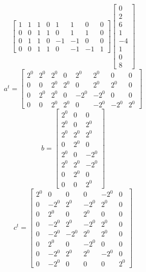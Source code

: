 \documentclass{article}%
\begin{document}
\[\left[\begin{matrix}1 & 1 & 1 & 0 & 1 & 1 & 0 & 0\\0 & 0 & 1 & 1 & 0 & 1 & 1 & 0\\0 & 1 & 1 & 0 & -1 & -1 & 0 & 0\\0 & 0 & 1 & 1 & 0 & -1 & -1 & 1\end{matrix}\right] \left[\begin{matrix}0\\2\\6\\1\\-4\\1\\0\\8\end{matrix}\right]%
\]%
\[%
a^{t} = \left[\begin{matrix}2^{0} & 2^{0} & 2^{0} & 0 & 2^{0} & 2^{0} & 0 & 0\\0 & 0 & 2^{0} & 2^{0} & 0 & 2^{0} & 2^{0} & 0\\0 & 2^{0} & 2^{0} & 0 & - 2^{0} & - 2^{0} & 0 & 0\\0 & 0 & 2^{0} & 2^{0} & 0 & - 2^{0} & - 2^{0} & 2^{0}\end{matrix}\right]%
\]%
\[%
b = \left[\begin{matrix}2^{0} & 0 & 0\\2^{0} & 0 & 2^{0}\\2^{0} & 2^{0} & 2^{0}\\0 & 2^{0} & 0\\2^{0} & 0 & - 2^{0}\\2^{0} & 2^{0} & - 2^{0}\\0 & 2^{0} & 0\\0 & 0 & 2^{0}\end{matrix}\right]%
\]%
\[%
c^{t} = \left[\begin{matrix}2^{0} & 0 & 0 & 0 & - 2^{0} & 0\\0 & - 2^{0} & 2^{0} & - 2^{0} & 2^{0} & 0\\0 & 2^{0} & 0 & 2^{0} & 0 & 0\\0 & - 2^{0} & 2^{0} & - 2^{0} & 2^{0} & 0\\0 & - 2^{0} & - 2^{0} & 2^{0} & 2^{0} & 0\\0 & 2^{0} & 0 & - 2^{0} & 0 & 0\\0 & - 2^{0} & 2^{0} & 2^{0} & - 2^{0} & 0\\0 & - 2^{0} & 0 & 0 & 0 & 2^{0}\end{matrix}\right]%
\]%
\end{document}
